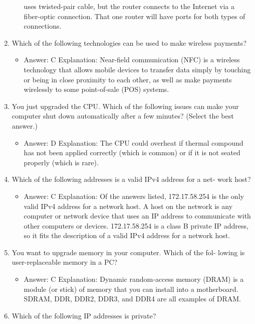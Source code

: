 \documentclass{article}
\begin{document}
\begin{enumerate}
\begin{itemize}
uses twisted-pair cable, but the router connects to the Internet via a fiber-optic connection.
That one router will have ports for both types of connections.
    \end{itemize}
    \item Which of the following technologies can be used to make wireless
payments?
    \begin{itemize}
        \item Answer: C
Explanation: Near-field communication (NFC) is a wireless technology that allows
mobile devices to transfer data simply by touching or being in close proximity to each
other, as well as make payments wirelessly to some point-of-sale (POS) systems.
    \end{itemize}
    \item You just upgraded the CPU. Which of the following issues can
make your computer shut down automatically after a few minutes?
(Select the best answer.)
    \begin{itemize}
        \item Answer: D
Explanation: The CPU could overheat if thermal compound has not been applied correctly
(which is common) or if it is not seated properly (which is rare).
    \end{itemize}
    \item Which of the following addresses is a valid IPv4 address for a net-
work host?
    \begin{itemize}
        \item Answer: C
Explanation: Of the answers listed, 172.17.58.254 is the only valid IPv4 address for a
network host. A host on the network is any computer or network device that uses an IP
address to communicate with other computers or devices. 172.17.58.254 is a class B
private IP address, so it fits the description of a valid IPv4 address for a network host.
    \end{itemize}
    \item You want to upgrade memory in your computer. Which of the fol-
lowing is user-replaceable memory in a PC?
    \begin{itemize}
        \item Answer: C
Explanation: Dynamic random-access memory (DRAM) is a module (or stick) of memory
that you can install into a motherboard. SDRAM, DDR, DDR2, DDR3, and DDR4
are all examples of DRAM.
    \end{itemize}
    \item Which of the following IP addresses is private?
    \begin{itemize}

\end{itemize}
\end{enumerate}
\end{document}
